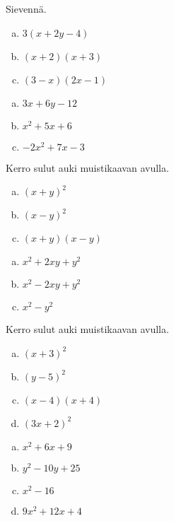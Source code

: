 \begin{tehtava}
    Sievennä.
    \begin{enumerate}[a)]
        \item $3(x+2y-4)$
        \item $(x+2)(x + 3)$
        \item $(3-x)(2x-1)$
\end{enumerate}
    \begin{vastaus}
        \begin{enumerate}[a)]
            \item $3x+6y-12$
            \item $x^2 +5x+6$
            \item $-2x^2+7x-3$
        \end{enumerate}
    \end{vastaus}
\end{tehtava}

\begin{tehtava}
    Kerro sulut auki muistikaavan avulla.
    \begin{enumerate}[a)]
        \item $(x+y)^2$
        \item $(x-y)^2$
        \item $(x+y)(x-y)$
    \end{enumerate}
    \begin{vastaus}
        \begin{enumerate}[a)]
        \item $x^2 +2xy+y^2$
        \item $x^2 -2xy +y^2$
        \item $x^2-y^2$
        \end{enumerate}
    \end{vastaus}
\end{tehtava}

\begin{tehtava}
    Kerro sulut auki muistikaavan avulla.
    \begin{enumerate}[a)]
        \item $(x+3)^2$
        \item $(y-5)^2$
        \item $(x-4)(x+4)$
        \item $(3x+2)^2$
    \end{enumerate}
    \begin{vastaus}
        \begin{enumerate}[a)]
        \item $x^2 +6x+9$
        \item $y^2 - 10y+25$
        \item $x^2 -16$
        \item $9x^2 +12x +4$
        \end{enumerate}
    \end{vastaus}
\end{tehtava}

